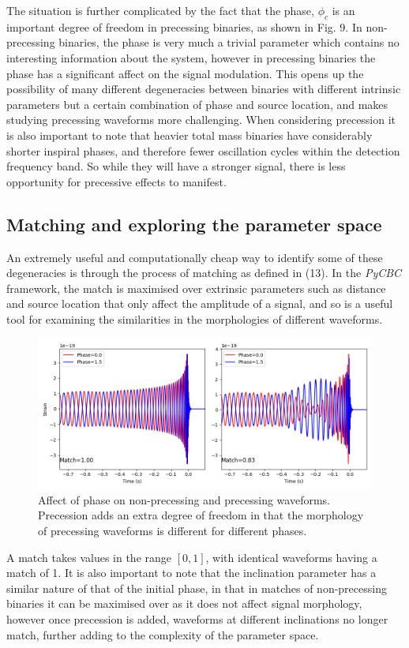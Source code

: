 \documentclass[11pt]{article}
\begin{document}
The situation is further complicated by the fact that the phase, $\phi_c$ is an important degree of freedom in precessing binaries, as shown in Fig. 9. In non-precessing binaries, the phase is very much a trivial parameter which contains no interesting information about the system, however in precessing binaries the phase has a significant affect on the signal modulation. This opens up the possibility of many different degeneracies between binaries with different intrinsic parameters but a certain combination of phase and source location, and makes studying precessing waveforms more challenging. When considering precession it is also important to note that heavier total mass binaries have considerably shorter inspiral phases, and therefore fewer oscillation cycles within the detection frequency band. So while they will have a stronger signal, there is less opportunity for precessive effects to manifest.
\subsection{Matching and exploring the parameter space}
An extremely useful and computationally cheap way to identify some of these degeneracies is through the process of matching as defined in (13). In the \textit{PyCBC} framework, the match is maximised over extrinsic parameters such as distance and source location that only affect the amplitude of a signal, and so is a useful tool for examining the similarities in the morphologies of different waveforms.

\begin{figure}[H]
	\includegraphics[scale=0.58]{fig9.png}
	\centering
	\caption{Affect of phase on non-precessing and precessing waveforms. Precession adds an extra degree of freedom in that the morphology of precessing waveforms is different for different phases.}
	\centering
\end{figure}

 A match takes values in the range $[0,1]$, with identical waveforms having a match of 1. It is also important to note that the inclination parameter has a similar nature of that of the initial phase, in that in matches of non-precessing binaries it can be maximised over as it does not affect signal morphology, however once precession is added, waveforms at different inclinations no longer match, further adding to the complexity of the parameter space.
\end{document}
